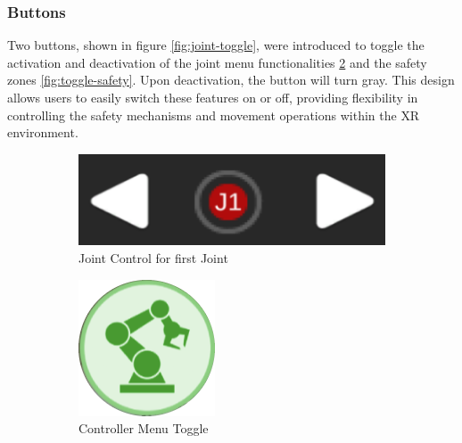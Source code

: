         
        \subsubsection{Buttons}
        
            Two buttons, shown in figure \ref{fig:joint-toggle}, were introduced to toggle the activation and deactivation of the joint menu 
            functionalities \ref{fig:toggle-joint} and the safety zones \ref{fig:toggle-safety}. Upon deactivation, the button will turn gray. 
            This design allows users to easily switch these features on or off, providing flexibility in controlling the safety mechanisms and movement 
            operations within the \ac{XR} environment.
            
            
            \begin{figure}[h]
            \centering
            \begin{subfigure}[b]{0.31\textwidth}    
                \centering
                \includegraphics[width=1\linewidth]{figs/joint-1.png}
                \caption{Joint Control for first Joint}
                \label{fig:joint-1}
                \end{subfigure}
            \hfill %
            \begin{subfigure}[b]{0.31\textwidth}
                \centering
                \includegraphics[width=0.3\linewidth]{figs/clicked_joints.png}
                \caption{Controller Menu Toggle}
                \label{fig:toggle-joint}
            \end{subfigure}
            \hfill
            \begin{subfigure}[b]{0.31\textwidth}

\end{subfigure}
\end{figure}
